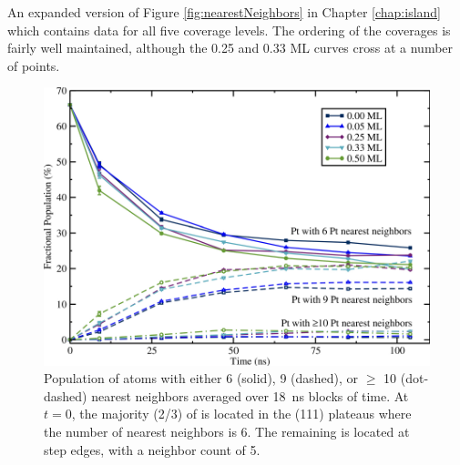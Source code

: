 An expanded version of Figure \ref{fig:nearestNeighbors} in Chapter \ref{chap:island} which contains data
for all five  coverage levels.  The ordering of the coverages
is fairly well maintained, although the 0.25 and 0.33 ML curves cross
at a number of points.

\begin{figure}
\includegraphics[width=\linewidth]{../figures/appA/nearestNeighbor_full_withmorenn_photoshopped.pdf}
\caption{Population of  atoms with either 6 (solid), 9
  (dashed), or $\ge$ 10 (dot-dashed)  nearest neighbors
  averaged over 18~ns blocks of time.  At $t = 0$, the majority
  (2/3) of  is located in the (111) plateaus where
  the number of  nearest neighbors is 6. The remaining 
  is located at step edges, with a  neighbor count of 5.}
\label{fig:nn_full} 
\end{figure}





